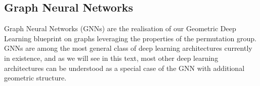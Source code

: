 %





\subsection{Graph Neural Networks}\label{sec:gnn-intro}



%





Graph Neural Networks (GNNs) are the realisation of our Geometric Deep Learning blueprint on graphs leveraging the properties of the permutation group. GNNs are among the most general class of deep learning architectures currently in existence, and as we will see in this text, most other deep learning architectures can be understood as a special case of the GNN with additional geometric structure. 


